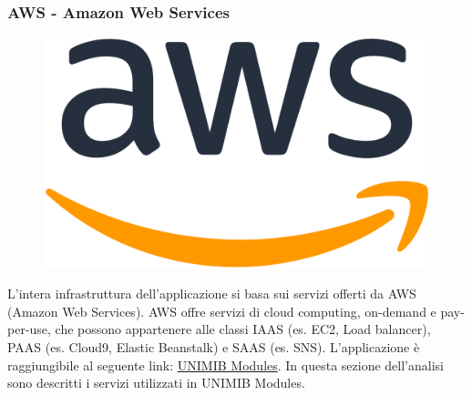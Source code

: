 \documentclass[12pt]{article}
\begin{document}
\subsubsection{AWS - Amazon Web Services}
\begin{figure}[H]
\includegraphics[scale=0.08, left]{aws-logo.png}
\end{figure}
L'intera infrastruttura dell'applicazione si basa sui servizi offerti da AWS (Amazon Web Services). AWS offre servizi di cloud computing, on-demand e pay-per-use, che possono appartenere alle classi IAAS (es. EC2, Load balancer), PAAS (es. Cloud9, Elastic Beanstalk) e SAAS (es. SNS). L'applicazione è raggiungibile al seguente link: \textcolor{blue}{\href{http://unimibquestionari-env.eba-3behr9mi.eu-central-1.elasticbeanstalk.com/}{UNIMIB Modules}}. In questa sezione dell'analisi sono descritti i servizi utilizzati in UNIMIB Modules. 
\end{document}
